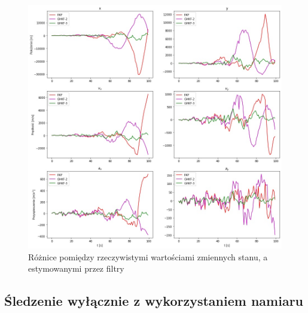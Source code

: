 \begin{figure}
	\centering
	\includegraphics[width=\linewidth]{2D_tracking_errors.jpg}
	\caption{Różnice pomiędzy rzeczywistymi wartościami zmiennych stanu, a estymowanymi przez filtry}
	\label{fig:2D_tracking_errors}
\end{figure}
\subsection{Śledzenie wyłącznie z wykorzystaniem namiaru}
\label{subsec:bot}
